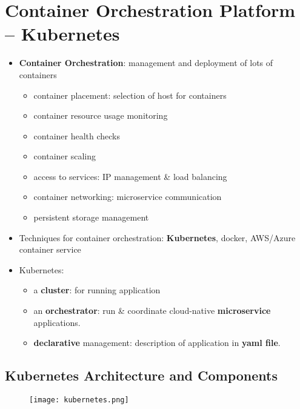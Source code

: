 \newpage
\section{Container Orchestration Platform -- Kubernetes}
\begin{itemize}
	\item \textbf{Container Orchestration}: management and deployment of lots of containers
	\begin{itemize}
		\item container placement: selection of host for containers
		\item container resource usage monitoring
		\item container health checks
		\item container scaling
		\item access to services: IP management \& load balancing
		\item container networking: microservice communication
		\item persistent storage management
	\end{itemize}
	\item Techniques for container orchestration: \textbf{Kubernetes}, docker, AWS/Azure container service
	\item Kubernetes:
	\begin{itemize}
		\item a \textbf{cluster}: for running application
		\item an \textbf{orchestrator}: run \& coordinate cloud-native \textbf{microservice} applications.
		
		\item \textbf{declarative} management: description of application in \textbf{yaml file}. 
	\end{itemize}
\end{itemize}

\subsection{Kubernetes Architecture and Components}

\begin{figure}[H]
	\centering
	\texttt{[image: kubernetes.png]}
\end{figure}
